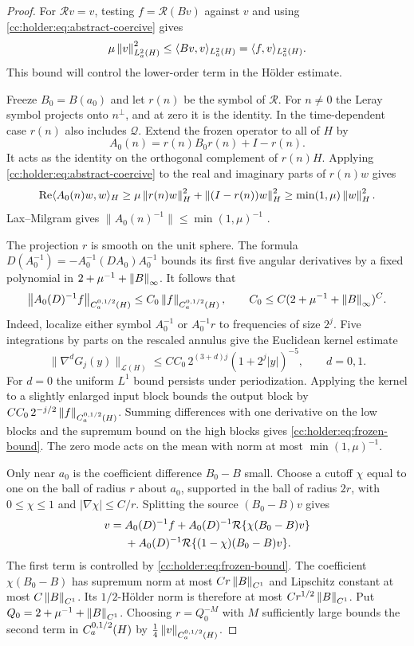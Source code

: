 \begin{proof}
For $\mathcal Rv=v$, testing $f=\mathcal R(Bv)$ against $v$ and using
\eqref{cc:holder:eq:abstract-coercive} gives
\[
 \mu\left\lVert v\right\rVert_{L^2_a(H)}^2
 \le \langle Bv,v\rangle_{L^2_a(H)}=\langle f,v\rangle_{L^2_a(H)} .
\]
This bound will control the lower-order term in the H\"older estimate.

Freeze $B_0=B(a_0)$ and let $r(n)$ be the symbol of $\mathcal R$.
For $n\ne0$ the Leray symbol projects onto $n^\perp$, and at zero it
is the identity. In the time-dependent case $r(n)$ also includes
$\mathcal Q$. Extend the frozen operator to all of $H$ by
\[
 A_0(n)=r(n)B_0r(n)+I-r(n).
\]
It acts as the identity on the orthogonal complement of $r(n)H$.
Applying \eqref{cc:holder:eq:abstract-coercive} to the real and
imaginary parts of $r(n)w$ gives
\[
 \operatorname{Re}\langle A_0(n)w,w\rangle_H
 \ge\mu\left\lVert r(n)w\right\rVert_H^2+\left\lVert(I-r(n))w\right\rVert_H^2
 \ge\min(1,\mu)\left\lVert w\right\rVert_H^2 .
\]
Lax--Milgram gives $\|A_0(n)^{-1}\|\le\min(1,\mu)^{-1}$
\cite[Section 6.2.1, Theorem 1]{Evans}.

The projection $r$ is smooth on the unit sphere. The formula
$D(A_0^{-1})=-A_0^{-1}(DA_0)A_0^{-1}$ bounds its first five angular
derivatives by a fixed polynomial in $2+\mu^{-1}+\left\lVert B\right\rVert_\infty$. It
follows that
\begin{equation}\label{cc:holder:eq:frozen-bound}
 \left\lVert A_0(D)^{-1}f\right\rVert_{C^{0,1/2}_a(H)}\le C_0\left\lVert f\right\rVert_{C^{0,1/2}_a(H)},
 \qquad C_0\le C(2+\mu^{-1}+\left\lVert B\right\rVert_\infty)^C.
\end{equation}
Indeed, localize either symbol $A_0^{-1}$ or $A_0^{-1}r$ to frequencies
of size $2^j$. Five integrations by parts on the rescaled annulus give
the Euclidean kernel estimate
\[
 \|\nabla^dG_j(y)\|_{\mathcal L(H)}
 \le CC_0\,2^{(3+d)j}(1+2^j|y|)^{-5},\qquad d=0,1 .
\]
For $d=0$ the uniform $L^1$ bound persists under periodization. Applying
the kernel to a slightly enlarged input block bounds the output block by
$CC_0\,2^{-j/2}\left\lVert f\right\rVert_{C^{0,1/2}_a(H)}$. Summing differences with one
derivative on the low blocks and the supremum bound on the high blocks
gives \eqref{cc:holder:eq:frozen-bound}.
The zero mode acts on the mean with norm at most $\min(1,\mu)^{-1}$.

Only near $a_0$ is the coefficient difference $B_0-B$ small.
Choose a cutoff $\chi$ equal to one on the ball of radius $r$ about
$a_0$, supported in the ball of radius $2r$, with $0\le\chi\le1$ and
$|\nabla\chi|\le C/r$. Splitting the source $(B_0-B)v$ gives
\begin{align}\label{cc:holder:eq:local}
 v={}&A_0(D)^{-1}f+A_0(D)^{-1}\mathcal R\{\chi(B_0-B)v\}\notag\\
 &+A_0(D)^{-1}\mathcal R\{(1-\chi)(B_0-B)v\}.
\end{align}
The first term is controlled by \eqref{cc:holder:eq:frozen-bound}.
The coefficient $\chi(B_0-B)$ has supremum norm at most
$Cr\left\lVert B\right\rVert_{C^1}$ and Lipschitz constant at most $C\left\lVert B\right\rVert_{C^1}$.
Its $1/2$-H\"older norm is therefore at most $Cr^{1/2}\left\lVert B\right\rVert_{C^1}$.
Put $Q_0=2+\mu^{-1}+\left\lVert B\right\rVert_{C^1}$. Choosing $r=Q_0^{-M}$ with $M$ sufficiently
large bounds the second term in
$C^{0,1/2}_a(H)$ by $\frac14\left\lVert v\right\rVert_{C^{0,1/2}_a(H)}$.


\end{proof}
